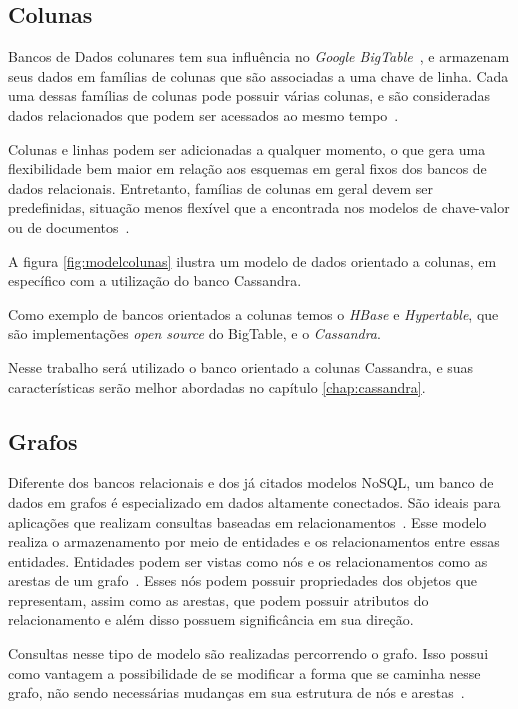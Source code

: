 \subsection*{Colunas}
Bancos de Dados colunares tem sua influência no \emph{Google BigTable}~\cite{bigtable}, e armazenam seus dados em famílias de colunas que são associadas a uma chave de linha. Cada uma dessas famílias de colunas pode possuir várias colunas, e são consideradas dados relacionados que podem ser acessados ao mesmo tempo~\cite{pramod}. 

Colunas e linhas podem ser adicionadas a qualquer momento, o que gera uma flexibilidade bem maior em relação aos esquemas em geral fixos dos bancos de dados relacionais.  Entretanto, famílias de colunas em geral devem ser predefinidas, situação menos flexível que a encontrada nos modelos de chave-valor ou de documentos~\cite{nosqleval}.  

A figura \ref{fig:modelcolunas} ilustra um modelo de dados orientado a colunas, em específico com a utilização do banco Cassandra.

Como exemplo de bancos orientados a colunas temos o \emph{HBase} e \emph{Hypertable}, que são implementações \emph{open source} do BigTable, e o \emph{Cassandra}.

Nesse trabalho será utilizado o banco orientado a colunas Cassandra, e suas características serão melhor abordadas no capítulo \ref{chap:cassandra}.


\subsection*{Grafos}
Diferente dos bancos relacionais e dos já citados modelos NoSQL, um banco de dados em grafos é especializado em dados altamente conectados. São ideais para aplicações que realizam consultas baseadas em relacionamentos~\cite{nosqleval}.
Esse modelo realiza o armazenamento por meio de entidades e os relacionamentos entre essas entidades. Entidades podem ser vistas como nós e os relacionamentos como as arestas de um grafo~\cite{pramod}. Esses nós podem possuir propriedades dos objetos que representam, assim como as arestas, que podem possuir atributos do relacionamento e além disso possuem significância em sua direção.

Consultas nesse tipo de modelo são realizadas percorrendo o grafo. Isso possui como vantagem a possibilidade de se modificar a forma que se caminha nesse grafo, não sendo necessárias mudanças em sua estrutura de nós e arestas~\cite{pramod}.

